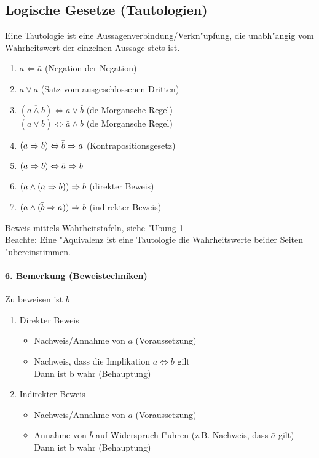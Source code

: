 \subsection{Logische Gesetze (Tautologien)}

Eine Tautologie ist eine Aussagenverbindung/Verkn"upfung, die unabh"angig vom Wahrheitswert der einzelnen Aussage stets \true ist.
\begin{enumerate}[label=\alph*)]
	\item $a\Leftarrow \bar{\bar{a}}$ (Negation der Negation)
	\item $a\lor a$ (Satz vom ausgeschlossenen Dritten)
	\item $(\overline{a\land b})\Leftrightarrow\bar a\lor \bar b$ (de Morgansche Regel)\\
	$(\overline{a\lor b})\Leftrightarrow\bar a\land \bar b$ (de Morgansche Regel)
	\item $(a\Rightarrow b)\Leftrightarrow\bar b\Rightarrow\bar a$ (Kontrapositionsgesetz)
	\item $(a\Rightarrow b)\Leftrightarrow\bar a\Rightarrow b$
	\item $(a\land(a\Rightarrow b))\Rightarrow b$ (direkter Beweis)
	\item $(a\land(\bar b\Rightarrow\bar a))\Rightarrow b$ (indirekter Beweis)
\end{enumerate}
Beweis mittels Wahrheitstafeln, siehe "Ubung 1\\
Beachte: Eine "Aquivalenz ist eine Tautologie \gdw die Wahrheitswerte beider Seiten "ubereinstimmen.

\paragraph{6. Bemerkung (Beweistechniken)} Zu beweisen ist $b$
\begin{enumerate}
	\item Direkter Beweis
	\begin{itemize}
		\item Nachweis/Annahme von $a$ (Voraussetzung)
		\item Nachweis, dass die Implikation $a\Leftrightarrow b$ gilt\\
		Dann ist b wahr (Behauptung)
	\end{itemize}
	\item Indirekter Beweis
	\begin{itemize}
		\item Nachweis/Annahme von $a$ (Voraussetzung)
		\item Annahme von $\bar b$ auf Widerspruch f"uhren (z.B. Nachweis, dass $\bar a$ gilt)\\
		Dann ist b wahr (Behauptung)
	\end{itemize}
\end{enumerate}

